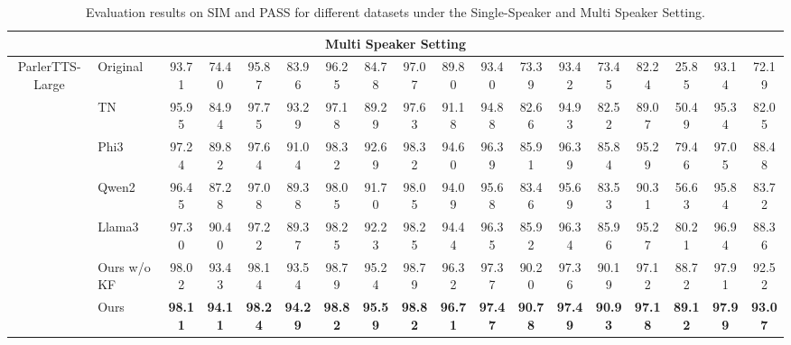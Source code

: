 \documentclass[11pt]{article}
\begin{document}
\begin{table}[tb]
{\begin{tabular}{clcccccccccccccccc}
				\midrule
				\multicolumn{18}{c}{\textbf{Multi Speaker Setting}}                                    \\
				\midrule
				\multirow{7}{*}{ParlerTTS-Large} & Original                & 93.71          & 74.40          & 95.87          & 83.96          & 96.25          & 84.78          & 97.07          & 89.80          & 93.40          & 73.39          & 93.42          & 73.45          & 82.24          & 25.85          & 93.14          & 72.19          \\
				& TN                      & 95.95          & 84.94          & 97.75          & 93.29          & 97.18          & 89.29          & 97.63          & 91.18          & 94.88          & 82.66          & 94.93          & 82.52          & 89.07          & 50.49          & 95.34          & 82.05          \\
				& Phi3                    & 97.24          & 89.82          & 97.64          & 91.04          & 98.32          & 92.69          & 98.32          & 94.60          & 96.39          & 85.91          & 96.39          & 85.84          & 95.29          & 79.46          & 97.05          & 88.48          \\
				& Qwen2                   & 96.45          & 87.28          & 97.08          & 89.38          & 98.05          & 91.70          & 98.05          & 94.09          & 95.68          & 83.46          & 95.69          & 83.53          & 90.31          & 56.63          & 95.84          & 83.72          \\
				& Llama3                  & 97.30          & 90.40          & 97.22          & 89.37          & 98.25          & 92.23          & 98.25          & 94.44          & 96.35          & 85.92          & 96.34          & 85.96          & 95.27          & 80.21          & 96.94          & 88.36          \\
				& Ours w/o KF             & 98.02          & 93.43          & 98.14          & 93.54          & 98.79          & 95.24          & 98.79          & 96.32          & 97.37          & 90.20          & 97.36          & 90.19          & 97.12          & 88.72          & 97.91          & 92.52          \\
				& Ours                    & \textbf{98.11} & \textbf{94.11} & \textbf{98.24} & \textbf{94.29} & \textbf{98.82} & \textbf{95.59} & \textbf{98.82} & \textbf{96.71} & \textbf{97.47} & \textbf{90.78} & \textbf{97.49} & \textbf{90.93} & \textbf{97.18} & \textbf{89.12} & \textbf{97.99} & \textbf{93.07}          \\
				\bottomrule[1.5pt]
				
			\end{tabular}
			
		}
		\caption{Evaluation results on SIM and PASS for different datasets under the Single-Speaker and Multi Speaker Setting.}
		\label{table:method_main_result}
	\end{table}
\end{document}
